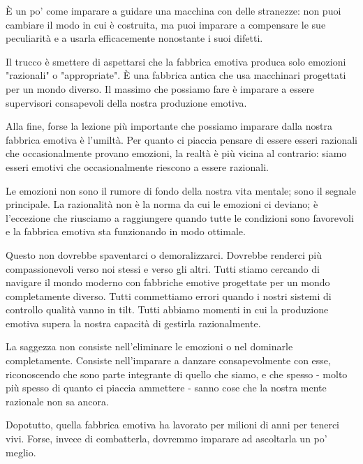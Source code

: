 È un po' come imparare a guidare una macchina con delle stranezze: non puoi cambiare il modo in cui è costruita, ma puoi imparare a compensare le sue peculiarità e a usarla efficacemente nonostante i suoi difetti.

Il trucco è smettere di aspettarsi che la fabbrica emotiva produca solo emozioni "razionali" o "appropriate". È una fabbrica antica che usa macchinari progettati per un mondo diverso. Il massimo che possiamo fare è imparare a essere supervisori consapevoli della nostra produzione emotiva.

\bigskip

Alla fine, forse la lezione più importante che possiamo imparare dalla nostra fabbrica emotiva è l'umiltà. Per quanto ci piaccia pensare di essere esseri razionali che occasionalmente provano emozioni, la realtà è più vicina al contrario: siamo esseri emotivi che occasionalmente riescono a essere razionali.

Le emozioni non sono il rumore di fondo della nostra vita mentale; sono il segnale principale. La razionalità non è la norma da cui le emozioni ci deviano; è l'eccezione che riusciamo a raggiungere quando tutte le condizioni sono favorevoli e la fabbrica emotiva sta funzionando in modo ottimale.

Questo non dovrebbe spaventarci o demoralizzarci. Dovrebbe renderci più compassionevoli verso noi stessi e verso gli altri. Tutti stiamo cercando di navigare il mondo moderno con fabbriche emotive progettate per un mondo completamente diverso. Tutti commettiamo errori quando i nostri sistemi di controllo qualità vanno in tilt. Tutti abbiamo momenti in cui la produzione emotiva supera la nostra capacità di gestirla razionalmente.

La saggezza non consiste nell'eliminare le emozioni o nel dominarle completamente. Consiste nell'imparare a danzare consapevolmente con esse, riconoscendo che sono parte integrante di quello che siamo, e che spesso - molto più spesso di quanto ci piaccia ammettere - sanno cose che la nostra mente razionale non sa ancora.

Dopotutto, quella fabbrica emotiva ha lavorato per milioni di anni per tenerci vivi. Forse, invece di combatterla, dovremmo imparare ad ascoltarla un po' meglio.